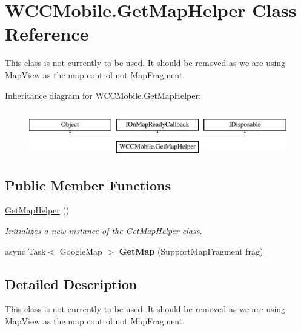\hypertarget{class_w_c_c_mobile_1_1_get_map_helper}{}\section{W\+C\+C\+Mobile.\+Get\+Map\+Helper Class Reference}
\label{class_w_c_c_mobile_1_1_get_map_helper}


This class is not currently to be used. It should be removed as we are using Map\+View as the map control not Map\+Fragment.  


Inheritance diagram for W\+C\+C\+Mobile.\+Get\+Map\+Helper\+:\begin{figure}[H]
\begin{center}
\leavevmode
\includegraphics[height=2.000000cm]{class_w_c_c_mobile_1_1_get_map_helper}
\end{center}
\end{figure}
\subsection*{Public Member Functions}
\begin{DoxyCompactItemize}
\item 
\hyperlink{class_w_c_c_mobile_1_1_get_map_helper_a505dc62eaa5505585193f426c02c3d21}{Get\+Map\+Helper} ()
\begin{DoxyCompactList}\small\item\em Initializes a new instance of the \hyperlink{class_w_c_c_mobile_1_1_get_map_helper}{Get\+Map\+Helper} class. \end{DoxyCompactList}\item 
async Task$<$ Google\+Map $>$ {\bfseries Get\+Map} (Support\+Map\+Fragment frag)\hypertarget{class_w_c_c_mobile_1_1_get_map_helper_abba9786feea429ff8e4442c0e60c660c}{}\label{class_w_c_c_mobile_1_1_get_map_helper_abba9786feea429ff8e4442c0e60c660c}

\end{DoxyCompactItemize}


\subsection{Detailed Description}
This class is not currently to be used. It should be removed as we are using Map\+View as the map control not Map\+Fragment. 

